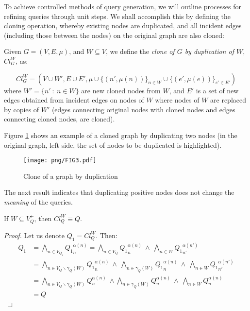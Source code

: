 \documentclass{article}%
\begin{document}
To achieve controlled methods of query generation, we will outline processes for refining queries through unit steps. We shall accomplish this by defining the cloning operation, whereby existing nodes are duplicated, and all incident edges (including those between the nodes) on the original graph are also cloned: 

\begin{definition}{}
    Given $G=(V,E,\mu)$, and $W\subseteq V$, we define the \emph{clone of $G$ by duplication of $W$}, $Cl_G^W$, as:
    
    $$Cl_G^W=(V\cup W',E\cup E',\mu\cup \{(n',\mu(n))\}_{n\in W}\cup \{(e',\mu(e))\}_{e'\in E'})$$
    where $W'=\{n'\ :\ n\in W\}$ are new cloned nodes from $W$, and $ E '$ is a set of new edges obtained from incident edges on nodes of $ W $ where nodes of $ W $ are replaced by copies of $ W' $ (edges connecting original nodes with cloned nodes and edges connecting cloned nodes, are cloned).
\end{definition}\medskip

Figure \ref{ejemplo-clonacion} shows an example of a cloned graph by duplicating two nodes (in the original graph, left side, the set of nodes to be duplicated is highlighted).
\begin{figure}[h]
    \begin{center}
        \texttt{[image: png/FIG3.pdf]}
    \end{center}
    \caption{%
        Clone of a graph by duplication
    }%
    \label{ejemplo-clonacion}
\end{figure}

The next result indicates that duplicating positive nodes does not change the \textit{meaning} of the queries.

\begin{theorem}{}
    If $W\subseteq V^+_Q$, then $Cl_Q^W\equiv Q$.
\end{theorem}
\begin{proof}{}
	Let us denote $ Q_1 = Cl_Q^W $. Then:
	\begin{align*}
	Q_1 &= \bigwedge_{n\in V_{Q_1}} {Q_1}_n^{\alpha(n)}
	 =\bigwedge_{n\in V_Q} {Q_1}_n^{\alpha(n)}\ \wedge \ \bigwedge_{n\in W} {Q_1}_{n'}^{\alpha(n')}\\
	&= \bigwedge_{n\in V_Q\smallsetminus \gamma_Q(W)} {Q_1}_n^{\alpha(n)}\ \wedge \ \bigwedge_{n\in\gamma_Q(W)} {Q_1}_n^{\alpha(n)}\ \wedge \ \bigwedge_{n\in W} {Q_1}_{n'}^{\alpha(n')}\\
	&= \bigwedge_{n\in V_Q\smallsetminus \gamma_Q(W)} Q_n^{\alpha(n)}\ \wedge \bigwedge_{n\in\gamma_Q(W)} Q_n^{\alpha(n)}\ \wedge \ \bigwedge_{n\in W} Q_n^{\alpha(n)}\\
	&= Q
	\end{align*}
\end{proof}
\end{document}
